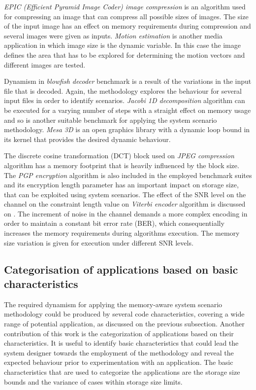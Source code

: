 \documentclass[a4paper,conference]{IEEEtran}
\begin{document}
\textit{EPIC (Efficient Pyramid Image Coder) image compression} is an algorithm used for compressing an image that can compress all possible sizes of images. The size of the input image has an effect on memory requirements during compression and several images were given as inputs. \textit{Motion estimation} is another media application in which image size is the dynamic variable. In this case the image defines the area that has to be explored for determining the motion vectors and different images are tested.

Dynamism in \textit{blowfish decoder} benchmark is a result of the variations in the input file that is decoded. Again, the methodology explores the behaviour for several input files in order to identify scenarios. \textit{Jacobi 1D decomposition} algorithm can be executed for a varying number of steps with a straight effect on memory usage and so is another suitable benchmark for applying the system scenario methodology. \textit{Mesa 3D} is an open graphics library with a dynamic loop bound in its kernel that provides the desired dynamic behaviour. 

The discrete cosine transformation (DCT) block used on \textit{JPEG compression} algorithm has a memory footprint that is heavily influenced by the block size. The \textit{PGP encryption} algorithm is also included in the employed benchmark suites and its encryption length parameter has an important impact on storage size, that can be exploited using system scenarios. The effect of the SNR level on the channel on the constraint length value on \textit{Viterbi encoder} algorithm is discussed on \cite{Fil12}. The increment of noise in the channel demands a more complex encoding in order to maintain a constant bit error rate (BER), which consequentially increases the memory requirements during algorithms execution. The memory size variation is given for execution under different SNR levels.  

\subsection{Categorisation of applications based on basic characteristics}
\label{sec:categorisation}
The required dynamism for applying the memory-aware system scenario methodology could be produced by several code characteristics, covering a wide range of potential application, as discussed on the previous subsection. Another contribution of this work is the categorization of applications based on their characteristics. It is useful to identify basic characteristics that could lead the system designer towards the employment of the methodology and reveal the expected behaviour prior to experimentation with an application. The basic characteristics that are used to categorize the applications are the storage size bounds and the variance of cases within storage size limits.
\end{document}
